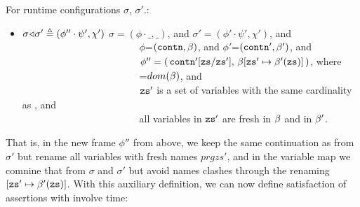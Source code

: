  \begin{definition}   \label{def:config:adapt}
 For runtime configurations $\sigma$, $\sigma'$.$:$
 $~ $ 

\begin{itemize}
\item
$\sigma \!\triangleleft\! \sigma' \triangleq (\phi''\cdot\psi',\chi')$  \IFF $\sigma=(\phi\cdot\_,\_)$, and $\sigma'= (\phi'\cdot\psi',\chi')$, and
 \\
$\ \strut \ \ \hspace{1.45in} $
$\phi$=$({\mbox{\tt{contn}}},{\beta})$, and $\phi'$=$({\mbox{\tt{contn}}}',{\beta}')$, and
 \\
$\ \strut \ \ \hspace{1.45in} $     %
  $\phi''=(\, {\mbox{\tt{contn}}}'[{\mbox{\tt{zs}}}/{\mbox{\tt{zs}}}' ],\,{\beta}[{\mbox{\tt{zs}}}'\mapsto {\ensuremath{\beta}}'({\mbox{\tt{zs}}})]\, ) $, where
 \\
$\ \strut \ \ \hspace{1.45in} $
=$dom({\beta})$, and
 \\
$\ \strut \ \ \hspace{1.45in} $      ${\mbox{\tt{zs}}}'$ is a set  of variables with  the  same cardinality as , and
 \\
$\ \strut \ \ \hspace{1.45in} $   all variables in
${\mbox{\tt{zs}}}'$  are fresh in ${\beta}$ and in ${\beta}'$.
\end{itemize}
\end{definition}

That is, in the new frame $\phi''$ from above, we keep the same continuation as from $\sigma'$ but rename all
variables with fresh names $prg{zs}'$, and in the variable map we comnine that from $\sigma$ and $\sigma'$
but avoid names clashes through the renaming $[{\mbox{\tt{zs}}}'\mapsto {\ensuremath{\beta}}'({\mbox{\tt{zs}}})]$.
With this auxiliary definition, we can now define satisfaction of assertions with involve time:


